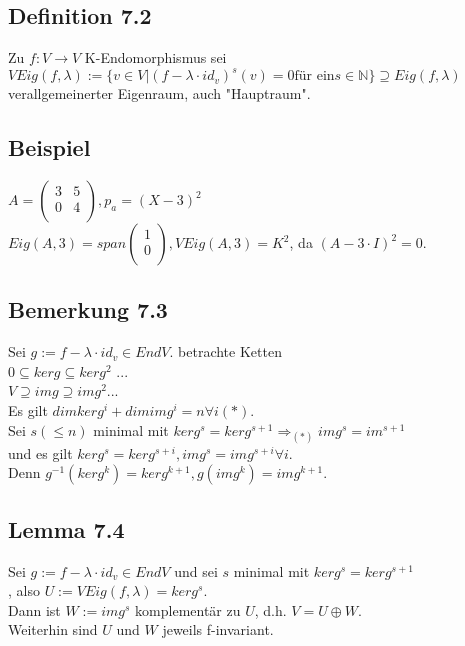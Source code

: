 \documentclass[a4paper, 12pt]{extarticle}
\begin{document}
\subsection*{Definition 7.2}
Zu $ f: V \rightarrow V$ K-Endomorphismus sei $VEig(f, \lambda) := \{ v \in V | (f - \lambda \cdot id_v)^s(v) = 0 \text{für ein} s \in \mathbb{N} \}\supseteq Eig(f, \lambda)$ verallgemeinerter Eigenraum, auch "Hauptraum".
\subsection*{Beispiel}
$A = 
\left( \begin{matrix}
	3 & 5 \\
	0 & 4 \\
\end{matrix} \right),
p_a = (X-3)^2$\\
$Eig(A,3) = span{\left(\begin{matrix}
		1 \\
		0 \\
	\end{matrix}\right)}, VEig(A,3) = K^2$, da $(A-3\cdot I)^2 = 0$.
\subsection*{Bemerkung 7.3}
Sei $g:= f - \lambda \cdot id_v \in EndV.$ betrachte Ketten\\ 
${0} \subseteq kerg \subseteq kerg^2$ ...\\
$V \supseteq img \supseteq img^2$...\\
Es gilt $dim kerg^i + dim img^i = n \forall i (*).$\\
Sei $s (\leq n)$ minimal mit $kerg^s = kerg^{s+1} \Rightarrow_{(*)} img^s = im^{s+1}$\\
 und es gilt $kerg^s = kerg^{s+i}, img^s = img^{s+i} \forall i$.\\
Denn $g^{-1}(kerg^k) = kerg^{k+1}, g(img^k) = img^{k+1}$.
\subsection*{Lemma 7.4}
Sei $g:= f - \lambda \cdot id_v \in EndV$ und sei $s$ minimal mit $kerg^s = kerg^{s+1}$\\
, also $U:= VEig(f, \lambda) = kerg^s$.\\
Dann ist $W:= img^s$ komplementär zu $U$, d.h. $V = U \oplus W$.\\
Weiterhin sind $U$ und $W$ jeweils f-invariant.
\end{document}
